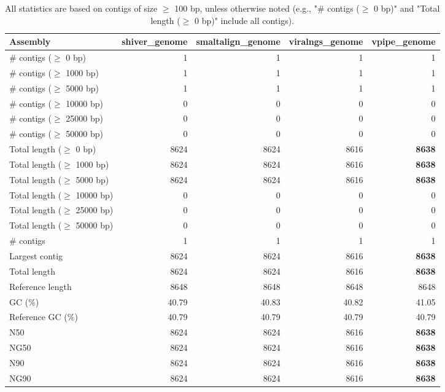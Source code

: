 \documentclass[12pt,a4paper]{article}
\begin{document}
\begin{table}[ht]
\begin{center}
\caption{All statistics are based on contigs of size $\geq$ 100 bp, unless otherwise noted (e.g., "\# contigs ($\geq$ 0 bp)" and "Total length ($\geq$ 0 bp)" include all contigs).}
\begin{tabular}{|l*{4}{|r}|}
\hline
Assembly & shiver\_genome & smaltalign\_genome & viralngs\_genome & vpipe\_genome \\ \hline
\# contigs ($\geq$ 0 bp) & 1 & 1 & 1 & 1 \\ \hline
\# contigs ($\geq$ 1000 bp) & 1 & 1 & 1 & 1 \\ \hline
\# contigs ($\geq$ 5000 bp) & 1 & 1 & 1 & 1 \\ \hline
\# contigs ($\geq$ 10000 bp) & 0 & 0 & 0 & 0 \\ \hline
\# contigs ($\geq$ 25000 bp) & 0 & 0 & 0 & 0 \\ \hline
\# contigs ($\geq$ 50000 bp) & 0 & 0 & 0 & 0 \\ \hline
Total length ($\geq$ 0 bp) & 8624 & 8624 & 8616 & {\bf 8638} \\ \hline
Total length ($\geq$ 1000 bp) & 8624 & 8624 & 8616 & {\bf 8638} \\ \hline
Total length ($\geq$ 5000 bp) & 8624 & 8624 & 8616 & {\bf 8638} \\ \hline
Total length ($\geq$ 10000 bp) & 0 & 0 & 0 & 0 \\ \hline
Total length ($\geq$ 25000 bp) & 0 & 0 & 0 & 0 \\ \hline
Total length ($\geq$ 50000 bp) & 0 & 0 & 0 & 0 \\ \hline
\# contigs & 1 & 1 & 1 & 1 \\ \hline
Largest contig & 8624 & 8624 & 8616 & {\bf 8638} \\ \hline
Total length & 8624 & 8624 & 8616 & {\bf 8638} \\ \hline
Reference length & 8648 & 8648 & 8648 & 8648 \\ \hline
GC (\%) & 40.79 & 40.83 & 40.82 & 41.05 \\ \hline
Reference GC (\%) & 40.79 & 40.79 & 40.79 & 40.79 \\ \hline
N50 & 8624 & 8624 & 8616 & {\bf 8638} \\ \hline
NG50 & 8624 & 8624 & 8616 & {\bf 8638} \\ \hline
N90 & 8624 & 8624 & 8616 & {\bf 8638} \\ \hline
NG90 & 8624 & 8624 & 8616 & {\bf 8638} \\ \hline

\end{tabular}
\end{center}
\end{table}
\end{document}
